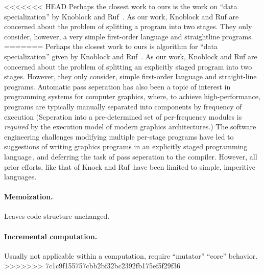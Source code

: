 <<<<<<< HEAD
Perhaps the closest work to ours is the work on ``data
specialization'' by Knoblock and Ruf~\cite{knoblock96}.  As our work,
Knoblock and Ruf are concerned about the problem of splitting a
program into two stages.  They only consider, however, a very simple
first-order language and straightline programs.
=======
Perhaps the closest work to ours is algorithm for ``data
specialization'' given by Knoblock and Ruf~\cite{knoblock96}.  As our
work, Knoblock and Ruf are concerned about the problem of splitting an
explicitly staged program into two stages.  However, they only
consider, simple first-order language and straight-line
programs. Automatic pass seperation has also been a topic of interest
in programming systems for computer graphics, where, to achieve
high-performance, programs are typically manually separated into
components by frequency of execution (Seperation into a pre-determined
set of per-frequency modules is \emph{required} by the execution model
of modern graphics architectures.)  The software engineering
challenges modifying multiple per-stage programs have led to
suggestions of writing graphics programs in an explicitly staged
programming language\,\cite{Proudfoot:2001,Foley:2011,He:2014}, and
deferring the task of pass seperation to the compiler. However, all
prior efforts, like that of Knock and Ruf\,\cite{knoblock96} have been
limited to simple, imperitive languages.  

\paragraph{Memoization.} Leaves code structure unchanged.

\paragraph{Incremental computation.} Usually not applicable within a
computation, require ``mutator'' ``core'' behavior.
>>>>>>> 7c1c9f155757cbb2bf32bc2392fb175ef5f29f36




